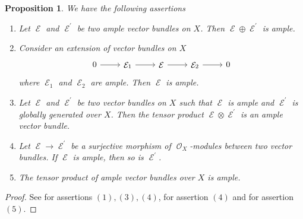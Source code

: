 \documentclass[11pt]{amsart}
\numberwithin{subsection}{section}
\numberwithin{figure}{section}
\numberwithin{table}{section}
\theoremstyle{1}
\newtheorem{proposition}[theorem]{Proposition}
\theoremstyle{2}
\DeclareMathOperator{\E}{\mathcal{E}}
\DeclareMathOperator{\Oc}{\mathcal{O}}
\begin{document}
\begin{proposition}\label{prop7}
We have the following assertions
\begin{enumerate}
\item Let $\E$ and $\E^\prime$ be two ample vector bundles on $X$. Then $\E \oplus \E^\prime$ is ample.
\item Consider an extension of vector bundles on $X$
\begin{equation*}
\begin{tikzcd}
0 \arrow[r] & \E_1 \arrow[r] & \E \arrow[r] & \E_2 \arrow[r] & 0
\end{tikzcd}
\end{equation*}
where $\E_1$ and $\E_2$ are ample. Then $\E$ is ample.
\item Let $\E$ and $\E^\prime$ be two vector bundles on $X$ such that $\E$ is ample and $\E^\prime$ is globally generated over $X$. Then the tensor product $\E \otimes \E^\prime$ is an ample vector bundle.
\item Let $\E \rightarrow \E^\prime$ be a surjective morphism of $\Oc_X$-modules between two vector bundles. If $\E$ is ample, then so is $\E^\prime$.
\item The tensor product of ample vector bundles over $X$ is ample. 
\end{enumerate}
\end{proposition}
\begin{proof}
See \cite[Proposition 2.2/Corollary 2.5]{MR193092} for assertions $(1),(3),(4)$, \cite[Corollary 3.4]{MR193092} for assertion $(4)$ and \cite[Theorem. 3.3]{MR289525} for assertion $(5)$.
\end{proof}
\end{document}
